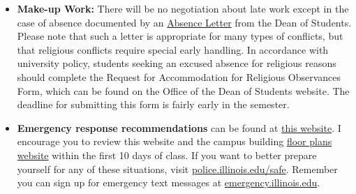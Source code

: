 \documentclass[11pt, a4paper]{article}
\begin{document}
\begin{itemize}
\begin{align*}
        G(t) &= G_0e^{-\lambda t}
        \intertext{where}
        G(t) &= \mbox{grade adjusted for lateness}\\
        G_0 &= \mbox{raw grade}\\
        \lambda &= \frac{ln(2)}{t_{\frac{1}{2}}} = \mbox{decay constant} \\
        t &= \mbox{time elapsed since due [hours]}\\
        t_{1/2} &= 1 = \mbox{half-life [hours]} \\
\end{align*}
\item[] \textbf{Make-up Work:} There will be no negotiation about late work 
        except in the case of absence documented by an 
                \href{https://odos.illinois.edu/community-of-care/resources/students/absence-letters/}{Absence Letter}
                from the Dean of Students.  
                Please note that such a letter is appropriate 
                for many types of conflicts, but that religious conflicts 
                require special early handling. In accordance with university 
                policy, students seeking an excused absence for religious 
                reasons should complete the Request for Accommodation for 
                Religious Observances Form, which can be found on the Office of 
                the Dean of Students website. The deadline for submitting this 
                form is fairly early in the semester.
\item[]\textbf{Emergency response recommendations} can be found at
        \href{http://police.illinois.edu/em/planning/emergency-response-guide/}{this website}.
        I encourage you to review this website and the campus building
        \href{http://police.illinois.edu/emergency-preparedness/building-emergency-action-plans/}{floor
        plans website} within the first 10 days of class.  If you want to
        better prepare yourself for any of these situations, visit
        \href{http://police.illinois.edu/safe}{police.illinois.edu/safe}. Remember you can sign up for emergency
        text messages at \href{http://emergency.illinois.edu}{emergency.illinois.edu}.


\end{itemize}
\end{document}
